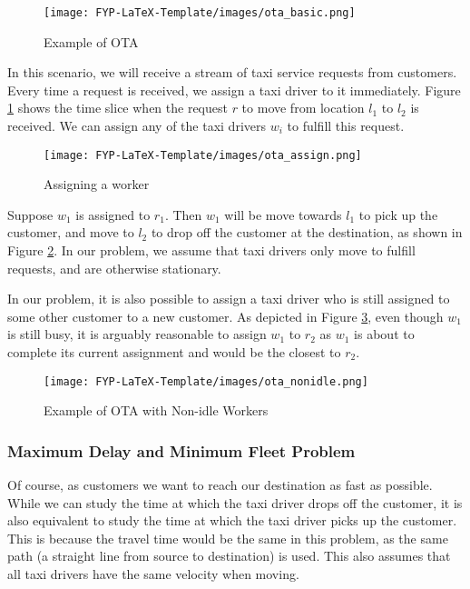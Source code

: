 \documentclass[urop]{socreport}
\begin{document}
\begin{figure}
    \centering
    \texttt{[image: FYP-LaTeX-Template/images/ota\_basic.png]}
    \caption{Example of OTA}
    \label{fig:idle}
\end{figure}

In this scenario, we will receive a stream of taxi service requests from customers. Every time a request is received, we assign a taxi driver to it immediately. Figure \ref{fig:idle} shows the time slice when the request $r$ to move from location $l_1$ to $l_2$ is received. We can assign any of the taxi drivers $w_i$ to fulfill this request.

\begin{figure}
    \centering
    \texttt{[image: FYP-LaTeX-Template/images/ota\_assign.png]}
    \caption{Assigning a worker}
    \label{fig:assign}
\end{figure}

Suppose $w_1$ is assigned to $r_1$. Then $w_1$ will be move towards $l_1$ to pick up the customer, and move to $l_2$ to drop off the customer at the destination, as shown in Figure \ref{fig:assign}. In our problem, we assume that taxi drivers only move to fulfill requests, and are otherwise stationary.


In our problem, it is also possible to assign a taxi driver who is still assigned to some other customer to a new customer. As depicted in Figure \ref{fig:nonidle}, even though $w_1$ is still busy, it is arguably reasonable to assign $w_1$ to $r_2$ as $w_1$ is about to complete its current assignment and would be the closest to $r_2$.

\begin{figure}
    \centering
    \texttt{[image: FYP-LaTeX-Template/images/ota\_nonidle.png]}
    \caption{Example of OTA with Non-idle Workers}
    \label{fig:nonidle}
\end{figure}

\subsubsection{Maximum Delay and Minimum Fleet Problem}
Of course, as customers we want to reach our destination as fast as possible. While we can study the time at which the taxi driver drops off the customer, it is also equivalent to study the time at which the taxi driver picks up the customer. This is because the travel time would be the same in this problem, as the same path (a straight line from source to destination) is used. This also assumes that all taxi drivers have the same velocity when moving.
\end{document}
